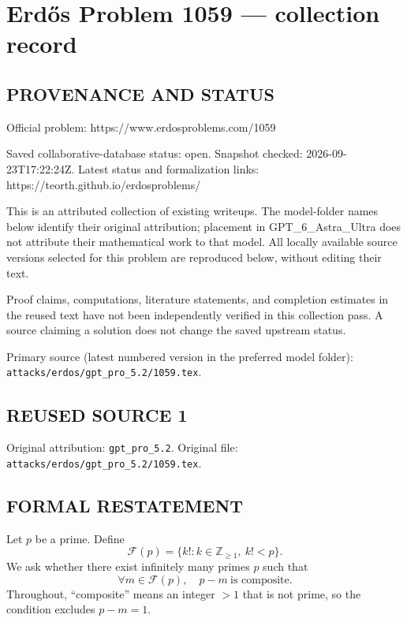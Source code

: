\section*{Erd\H{o}s Problem 1059 --- collection record}

\subsection*{PROVENANCE AND STATUS}
Official problem: https://www.erdosproblems.com/1059

Saved collaborative-database status: open.
Snapshot checked: 2026-09-23T17:22:24Z.
Latest status and formalization links: https://teorth.github.io/erdosproblems/

This is an attributed collection of existing writeups. The model-folder names below identify their original attribution; placement in GPT\_6\_Astra\_Ultra does not attribute their mathematical work to that model. All locally available source versions selected for this problem are reproduced below, without editing their text.

Proof claims, computations, literature statements, and completion estimates in the reused text have not been independently verified in this collection pass. A source claiming a solution does not change the saved upstream status.

Primary source (latest numbered version in the preferred model folder): \texttt{attacks/erdos/gpt\_pro\_5.2/1059.tex}.

\subsection*{REUSED SOURCE 1}
Original attribution: \texttt{gpt\_pro\_5.2}.
Original file: \texttt{attacks/erdos/gpt\_pro\_5.2/1059.tex}.


\subsection*{FORMAL RESTATEMENT}
Let $p$ be a prime. Define
\[
\mathcal F(p)=\{k! : k\in\mathbb Z_{\ge 1},\ k!<p\}.
\]
We ask whether there exist infinitely many primes $p$ such that
\[
\forall m\in\mathcal F(p),\quad p-m\ \text{is composite}.
\]
Throughout, ``composite'' means an integer $>1$ that is not prime, so the condition excludes $p-m=1$.

